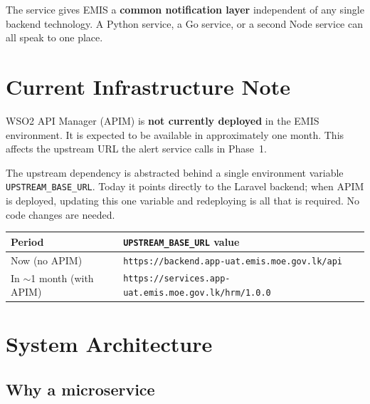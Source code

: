 \documentclass[11pt]{article}
\begin{document}
The service gives EMIS a \textbf{common notification layer} independent of any single backend
technology. A Python service, a Go service, or a second Node service can all speak to one place.

\section{Current Infrastructure Note}

\begin{warnbox}
WSO2 API Manager (APIM) is \textbf{not currently deployed} in the EMIS environment.
It is expected to be available in approximately one month. This affects the upstream
URL the alert service calls in Phase~1.
\end{warnbox}

The upstream dependency is abstracted behind a single environment variable
\texttt{UPSTREAM\_BASE\_URL}. Today it points directly to the Laravel backend;
when APIM is deployed, updating this one variable and redeploying is all that is
required. No code changes are needed.

\begin{table}[h]
\small
\begin{tabularx}{\textwidth}{l X}
\toprule
\textbf{Period} & \textbf{\texttt{UPSTREAM\_BASE\_URL} value} \\
\midrule
Now (no APIM) & \texttt{https://backend.app-uat.emis.moe.gov.lk/api} \\
In $\sim$1 month (with APIM) & \texttt{https://services.app-uat.emis.moe.gov.lk/hrm/1.0.0} \\
\bottomrule
\end{tabularx}
\end{table}

\section{System Architecture}

\subsection{Why a microservice}
\end{document}

